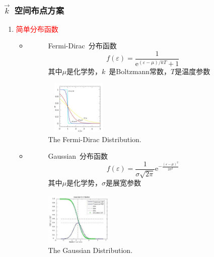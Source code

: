 \frame
{
\frametitle{$\vec k$~空间布点方案}
\begin{enumerate}
	\item \textcolor{red}{简单分布函数}\\
		\begin{itemize}
			\item 
				\begin{figure}[h!]
					\begin{minipage}[t]{0.40\linewidth}
						\textrm{Fermi-Dirac~}分布函数$$f(\varepsilon)=\dfrac1{\mathrm{e}^{(\varepsilon-\mu)/kT}+1}$$ 
						其中$\mu$是化学势，$k$~是\textrm{Boltzmann}常数，$T$是温度参数
					\end{minipage}
				\hfill
					\begin{minipage}[t]{0.55\linewidth}
					\centering
					\vspace*{-0.35in}
					\hspace*{-0.5in}
					\includegraphics[height=1.0in,width=1.25in,viewport=0 0 530 500,clip]{Figures/Fermi-Dirac-distribution.jpg}
					\caption{\textrm{The Fermi-Dirac Distribution.}}%
					\label{Fermi-Dirac-distribution}
					\end{minipage}
				\end{figure} 
			\item 
				\begin{figure}[h!]
					\begin{minipage}[t]{0.40\linewidth}
						\textrm{Gaussian~}分布函数$$f(\varepsilon)=\dfrac1{\sigma\sqrt{2\pi}}\mathrm{e}^{-\frac{(\varepsilon-\mu)^2}{2\sigma^2}}$$
						其中$\mu$是化学势，$\sigma$是展宽参数
					\end{minipage}
				\hfill
					\begin{minipage}[t]{0.55\linewidth}
					\centering
					\vspace*{-0.35in}
					\hspace*{-0.5in}
					\includegraphics[height=1.0in,width=1.25in,viewport=0 0 530 500,clip]{Figures/Gaussian-distribution.jpg}
					\caption{\tiny \textrm{The Gaussian Distribution.}}%
					\label{Gaussian-distribution}
					\end{minipage}
				\end{figure} 
		\end{itemize}
\end{enumerate}
}

